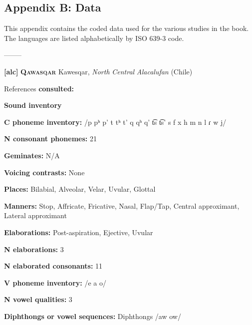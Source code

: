 

\subsection{Appendix B: Data}

This appendix contains the coded data used for the various studies in the book. The languages are listed alphabetically by ISO 639-3 code.



--------



\textbf{[alc]}   \textbf{\textsc{Qawasqar}}  Kawesqar, \textit{North} \textit{Central} \textit{Alacalufan} (Chile)



References \textbf{consulted:} \citet{Aguilera2001,Clairis1977,Clairis1985,ViegasBarros1990}



\textbf{Sound inventory}



\textbf{C phoneme inventory:} /p pʰ p’ t tʰ t’ q qʰ q’ t͡s t͡s’ s f x h m n l ɾ w j/



\textbf{N consonant phonemes:} 21



\textbf{Geminates:} N/A



\textbf{Voicing contrasts:} None



\textbf{Places:} Bilabial, Alveolar, Velar, Uvular, Glottal



\textbf{Manners:} Stop, Affricate, Fricative, Nasal, Flap/Tap, Central approximant, Lateral approximant



\textbf{Elaborations:} Post-aspiration, Ejective, Uvular



\textbf{N elaborations:} 3



\textbf{N elaborated consonants:} 11



\textbf{V phoneme inventory:} /e a o/



\textbf{N vowel qualities:} 3



\textbf{Diphthongs or vowel sequences:} Diphthongs /aw ow/



